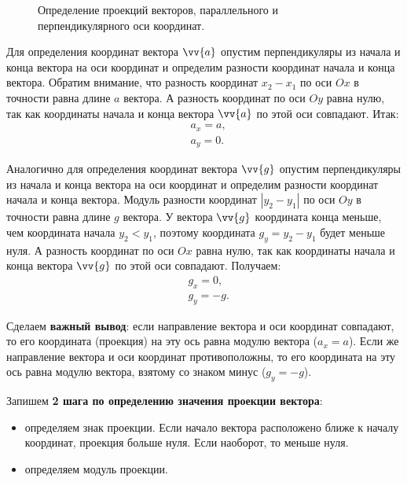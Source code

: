 \begin{figure}[h]
  \caption{\small Определение проекций векторов, параллельного и перпендикулярного
    оси координат.}\label{pic:vec_coord0}
\end{figure}

Для определения координат вектора $\vv{a}$ опустим перпендикуляры из начала и конца
вектора на оси координат и определим разности координат начала и конца вектора.
Обратим внимание, что разность координат $x_2-x_1$ по оси $Ox$ в точности
равна длине $a$ вектора. А разность координат по оси $Oy$ равна нулю, так как
координаты начала и конца вектора $\vv{a}$ по этой оси совпадают.
Итак:
\begin{align*}
  &a_x = a,\\
  &a_y = 0.
\end{align*}

Аналогично для определения координат вектора $\vv{g}$ опустим перпендикуляры из начала и конца
вектора на оси координат и определим разности координат начала и конца вектора.
Модуль разности координат $|y_2-y_1|$ по оси $Oy$ в точности
равна длине $g$ вектора. У вектора $\vv{g}$ координата конца меньше,
чем координата начала $y_2<y_1$, поэтому координата $g_y=y_2-y_1$ будет меньше нуля.
А разность координат по оси $Ox$ равна нулю, так как
координаты начала и конца вектора $\vv{g}$ по этой оси совпадают.
Получаем:
\begin{align*}
  &g_x  = 0,\\
  &g_y = -g.
\end{align*}

Сделаем \textbf{важный вывод}:
если направление вектора и оси координат совпадают, то его координата
(проекция) на эту ось равна модулю вектора ($a_x = a$).
Если же направление вектора и оси координат противоположны, то его координата
на эту ось равна модулю вектора, взятому со знаком минус ($g_y = -g$).

Запишем \textbf{2 шага по определению значения проекции вектора}:
\begin{itemize}
\item определяем знак проекции. Если начало вектора расположено ближе к началу
  координат, проекция больше нуля. Если наоборот, то меньше нуля.
  \item определяем модуль проекции.
\end{itemize}

